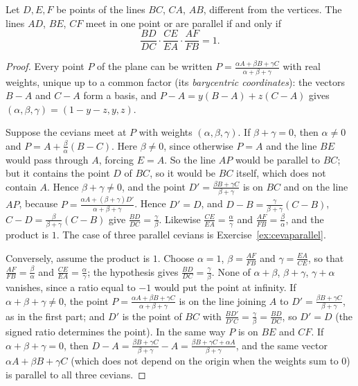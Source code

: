 \begin{theorem}[Ceva]\label{thm:ceva}
Let $D,E,F$ be points of the lines $BC$, $CA$, $AB$, different from the vertices. The lines $AD$, $BE$, $CF$ meet in one point or are
parallel if and only if
\[
\frac{BD}{DC}\cdot\frac{CE}{EA}\cdot\frac{AF}{FB}=1 .
\]
\end{theorem}
\begin{proof}
Every point $P$ of the plane can be written $P=\frac{\alpha A+\beta B+\gamma C}{\alpha+\beta+\gamma}$ with real weights, unique up to a
common factor (its \emph{barycentric coordinates}): the vectors $B-A$ and $C-A$ form a basis, and $P-A=y(B-A)+z(C-A)$ gives
$(\alpha,\beta,\gamma)=(1-y-z,y,z)$.

Suppose the cevians meet at $P$ with weights $(\alpha,\beta,\gamma)$. If $\beta+\gamma=0$, then $\alpha\ne0$ and $P=A+\frac\beta\alpha(B-C)$.
Here $\beta\ne0$, since otherwise $P=A$ and the line $BE$ would pass through $A$, forcing $E=A$. So the line $AP$ would be parallel to
$BC$; but it contains the point $D$ of $BC$, so it would be $BC$ itself, which does not contain $A$. Hence $\beta+\gamma\neq0$, and the point $D'=\frac{\beta B+\gamma C}{\beta+\gamma}$ is on $BC$ and on the line $AP$, because
$P=\frac{\alpha A+(\beta+\gamma)D'}{\alpha+\beta+\gamma}$. Hence $D'=D$, and $D-B=\frac{\gamma}{\beta+\gamma}(C-B)$, $C-D=\frac{\beta}{\beta+\gamma}(C-B)$ give
$\frac{BD}{DC}=\frac\gamma\beta$. Likewise $\frac{CE}{EA}=\frac\alpha\gamma$ and $\frac{AF}{FB}=\frac\beta\alpha$, and the product is $1$. The case of
three parallel cevians is Exercise~\ref{ex:cevaparallel}.

Conversely, assume the product is $1$. Choose $\alpha=1$, $\beta=\frac{AF}{FB}$ and $\gamma=\frac{EA}{CE}$, so that
$\frac{AF}{FB}=\frac\beta\alpha$ and $\frac{CE}{EA}=\frac\alpha\gamma$; the hypothesis gives $\frac{BD}{DC}=\frac\gamma\beta$. None of $\alpha+\beta$,
$\beta+\gamma$, $\gamma+\alpha$ vanishes, since a ratio equal to $-1$ would put the point at infinity. If $\alpha+\beta+\gamma\ne0$,
the point $P=\frac{\alpha A+\beta B+\gamma C}{\alpha+\beta+\gamma}$ is on the line joining $A$ to $D'=\frac{\beta B+\gamma C}{\beta+\gamma}$, as in the
first part; and $D'$ is the point of $BC$ with $\frac{BD'}{D'C}=\frac\gamma\beta=\frac{BD}{DC}$, so $D'=D$ (the signed ratio determines the point).
In the same way $P$ is on $BE$ and $CF$.
If $\alpha+\beta+\gamma=0$, then $D-A=\frac{\beta B+\gamma C}{\beta+\gamma}-A=\frac{\beta B+\gamma C+\alpha A}{\beta+\gamma}$, and the same
vector $\alpha A+\beta B+\gamma C$ (which does not depend on the origin when the weights sum to $0$) is parallel to all three
cevians.
\end{proof}

